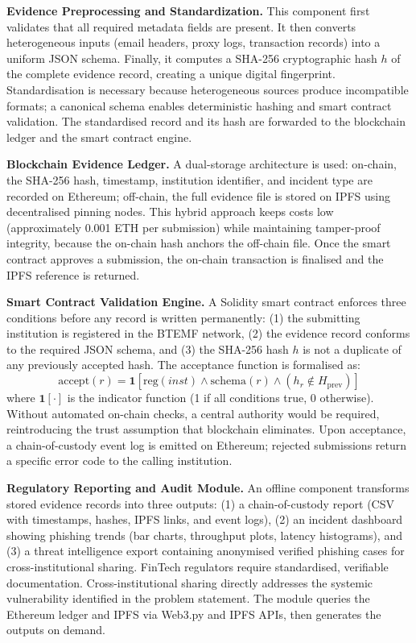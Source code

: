 \documentclass[conference]{IEEEtran}
\begin{document}
\textbf{Evidence Preprocessing and Standardization.} This component first validates that all required metadata fields are present. It then converts heterogeneous inputs (email headers, proxy logs, transaction records) into a uniform JSON schema. Finally, it computes a SHA-256 cryptographic hash \(h\) of the complete evidence record, creating a unique digital fingerprint. Standardisation is necessary because heterogeneous sources produce incompatible formats; a canonical schema enables deterministic hashing and smart contract validation. The standardised record and its hash are forwarded to the blockchain ledger and the smart contract engine.

\textbf{Blockchain Evidence Ledger.} A dual-storage architecture is used: on-chain, the SHA-256 hash, timestamp, institution identifier, and incident type are recorded on Ethereum; off-chain, the full evidence file is stored on IPFS using decentralised pinning nodes. This hybrid approach keeps costs low (approximately 0.001 ETH per submission) while maintaining tamper-proof integrity, because the on-chain hash anchors the off-chain file. Once the smart contract approves a submission, the on-chain transaction is finalised and the IPFS reference is returned.

\textbf{Smart Contract Validation Engine.} A Solidity smart contract enforces three conditions before any record is written permanently: (1) the submitting institution is registered in the BTEMF network, (2) the evidence record conforms to the required JSON schema, and (3) the SHA-256 hash \(h\) is not a duplicate of any previously accepted hash. The acceptance function is formalised as:
\[
\text{accept}(r) = \mathbf{1}\left[ \text{reg}(inst) \land \text{schema}(r) \land (h_r \notin H_{\text{prev}}) \right]
\]
where \(\mathbf{1}[\cdot]\) is the indicator function (1 if all conditions true, 0 otherwise). Without automated on-chain checks, a central authority would be required, reintroducing the trust assumption that blockchain eliminates. Upon acceptance, a chain-of-custody event log is emitted on Ethereum; rejected submissions return a specific error code to the calling institution.

\textbf{Regulatory Reporting and Audit Module.} An offline component transforms stored evidence records into three outputs: (1) a chain-of-custody report (CSV with timestamps, hashes, IPFS links, and event logs), (2) an incident dashboard showing phishing trends (bar charts, throughput plots, latency histograms), and (3) a threat intelligence export containing anonymised verified phishing cases for cross-institutional sharing. FinTech regulators require standardised, verifiable documentation. Cross-institutional sharing directly addresses the systemic vulnerability identified in the problem statement. The module queries the Ethereum ledger and IPFS via Web3.py and IPFS APIs, then generates the outputs on demand.
\end{document}
